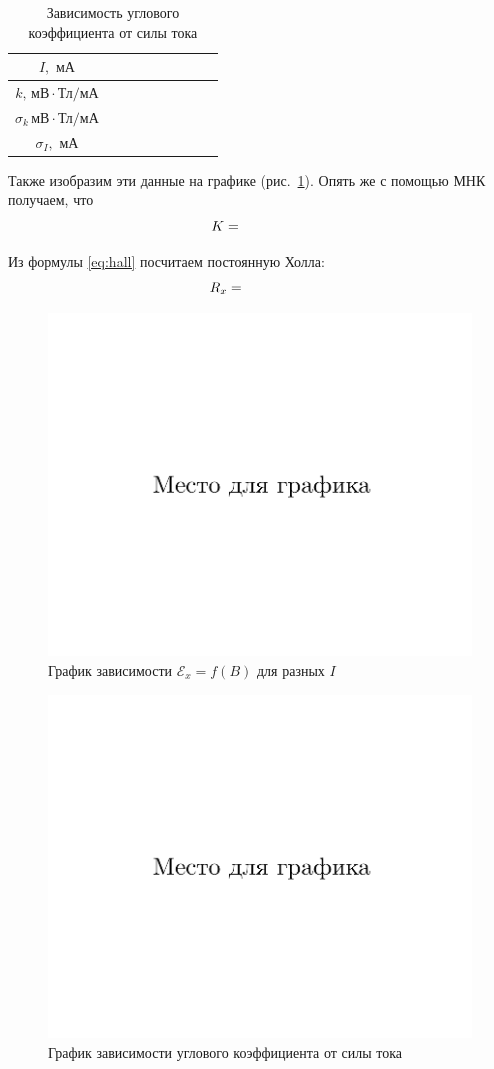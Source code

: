 \documentclass{physlab}
\begin{document}
\begin{table}[H]
	\centering
	\caption{Зависимость углового коэффициента от силы тока}
	\label{tbl:I(k)}
	\begin{tabu}{|c|X[c]|X[c] |X[c]| X[c]| X[c]| X[c]| X[c]| X[c]|}
		\hline
		$I, \text{ мА}$                                           & \val    &    &     &    &     &     &    &    \\ \hline
		$k,\,\text{мВ}\cdot\text{Тл}\slash\text{мА}$          & & & & & & & &\\ \hline
		$\sigma_k\,\text{мВ}\cdot\text{Тл}\slash\text{мА}$ & & & & & & & &  \\ \hline
		$\sigma_I, \text{ мА}$                                 &                                              \\\hline
	\end{tabu}
\end{table}
Также изобразим эти данные на графике (рис.~\ref{img:k(I)}). Опять же с помощью МНК получаем, что
\[K = \val\]

Из формулы \eqref{eq:hall} посчитаем постоянную Холла:
\[ R_x = \val \]

\begin {figure}[H]
\centering
	\includegraphics[width = 0.65 \textwidth]{foo}
\caption{График зависимости $\mathscr{E}_x = f(B)$ для разных $I$}
\end {figure}
	
\begin {figure}[H]
\centering
    \includegraphics[width = 0.65 \textwidth]{foo}
\caption{График зависимости углового коэффициента от силы тока}
\label{img:k(I)}
\end {figure}
\end{document}
